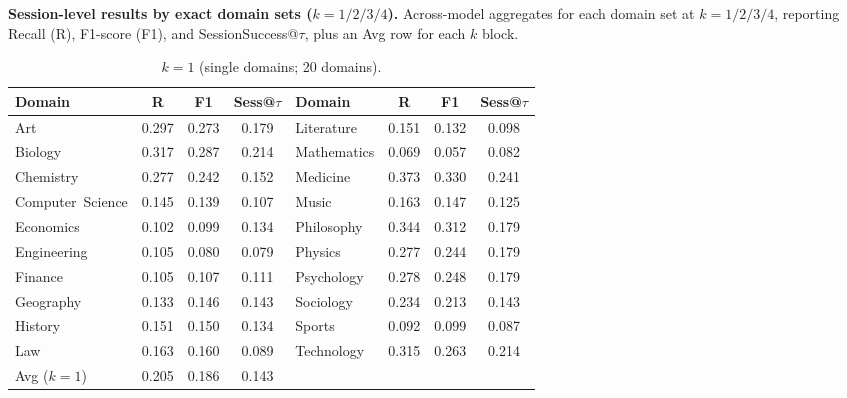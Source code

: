 \begin{table}[!ht]
\centering
\small
\setlength{\tabcolsep}{3.6pt}
\renewcommand{\arraystretch}{1.08}
\caption{\textbf{Session-level results by exact domain sets ($k{=}1/2/3/4$).}
Across-model aggregates for each domain set at $k{=}1/2/3/4$, reporting Recall (R), F1-score (F1), and SessionSuccess@$\tau$, plus an Avg row for each $k$ block.}
\label{tab:d4_all}
\begin{subtable}[t]{\textwidth}
\caption{$k{=}1$ (single domains; 20 domains).}
\centering
\begin{tabular}{lccc@{\hspace{1.5em}}lccc}
\toprule
Domain &
R & F1 &
Sess@$\tau$ &
Domain &
R & F1 &
Sess@$\tau$ \\
\midrule
Art               & 0.297 & 0.273 & 0.179 &
Literature        & 0.151 & 0.132 & 0.098 \\
Biology           & 0.317 & 0.287 & 0.214 &
Mathematics       & 0.069 & 0.057 & 0.082 \\
Chemistry         & 0.277 & 0.242 & 0.152 &
Medicine          & 0.373 & 0.330 & 0.241 \\
Computer\ Science & 0.145 & 0.139 & 0.107 &
Music             & 0.163 & 0.147 & 0.125 \\
Economics         & 0.102 & 0.099 & 0.134 &
Philosophy        & 0.344 & 0.312 & 0.179 \\
Engineering       & 0.105 & 0.080 & 0.079 &
Physics           & 0.277 & 0.244 & 0.179 \\
Finance           & 0.105 & 0.107 & 0.111 &
Psychology        & 0.278 & 0.248 & 0.179 \\
Geography         & 0.133 & 0.146 & 0.143 &
Sociology         & 0.234 & 0.213 & 0.143 \\
History           & 0.151 & 0.150 & 0.134 &
Sports            & 0.092 & 0.099 & 0.087 \\
Law               & 0.163 & 0.160 & 0.089 &
Technology        & 0.315 & 0.263 & 0.214 \\
\midrule
Avg ($k{=}1$) & 0.205 & 0.186 & 0.143 & & & & \\
\bottomrule
\end{tabular}
\end{subtable}


\end{table}
